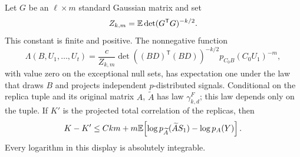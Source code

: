\begin{lemma}\label{lem:gaussian-test}
Let $G$ be an $\ell\times m$ standard Gaussian matrix and set
\[
 Z_{k,m}=\mathbb E\det(G^{\mathsf T}G)^{-k/2}.
\]
This constant is finite and positive. The nonnegative function
\begin{equation}\label{eq:gaussian-projected-test}
 \Lambda(B,U_1,\ldots,U_t)
 =\frac{c}{Z_{k,m}}
  \det((BD)^{\mathsf T}(BD))^{-k/2}
  p_{C_0B}(C_0U_1)^{-m},
\end{equation}
with value zero on the exceptional null sets, has expectation
one under the law that draws $B$ and projects independent $p$-distributed
signals. Conditional on the replica tuple and its original matrix $A$,
$\widetilde A$ has law $\gamma_{k,d}^{F}$; this law depends only on the
tuple. If $K'$ is the projected total correlation of the replicas, then
\begin{equation}\label{eq:gaussian-correlation-loss}
 K-K'\le Ckm+
 m\mathbb E\!\left[\log p_{\widetilde A}(\widetilde A S_1)-\log p_A(Y)\right].
\end{equation}
Every logarithm in this display is absolutely integrable.
\end{lemma}

